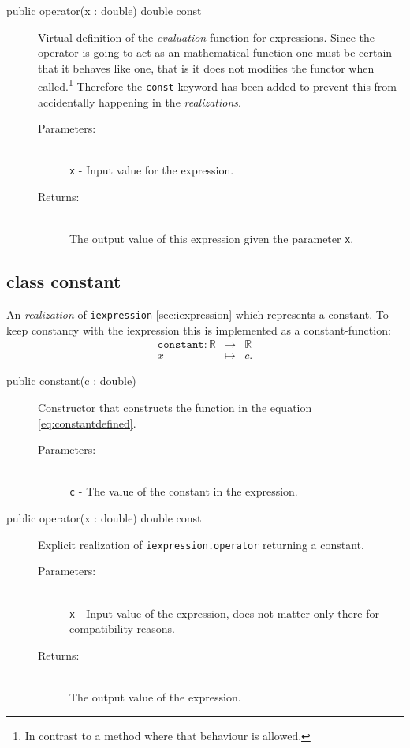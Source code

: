 \documentclass[a4paper,11pt]{kth-mag}
\newcommand{\RR}{\ensuremath{\mathbb{R}}}
\begin{document}
\begin{description}
    \item[public operator(x : double) double const] 
    Virtual definition of the \emph{evaluation} function for expressions. 
    Since the operator is going to act as an mathematical function one must be certain
    that it behaves like one, that is it does not modifies the functor when
    called.\footnote{In contrast to a method where that behaviour is allowed.}
    Therefore the \texttt{const} keyword has been added to prevent this
    from accidentally happening in the \emph{realizations}.
    \begin{description}
        \item[Parameters:]~\\
            \verb+x+ - Input value for the expression. 
        \item[Returns:]~\\
            The output value of this expression given the parameter \texttt{x}.
    \end{description}
\end{description}

\subsection{class constant} An \emph{realization} of \texttt{iexpression}
\ref{sec:iexpression} which represents a constant. To keep constancy with the
iexpression this is implemented as a constant-function:
\begin{eqnarray}
    \label{eq:constantdefined}
    \texttt{constant}: \RR &\rightarrow& \RR \nonumber \\
    x &\mapsto& c .
\end{eqnarray}
\begin{description}
    \item[public constant(c : double)] Constructor 
    that constructs the function in the equation \ref{eq:constantdefined}. 
    \begin{description}
        \item[Parameters:]~\\
            \verb+c+ - The value of the constant in the expression.
    \end{description}
\end{description}
\begin{description}
    \item[public operator(x : double) double const] 
    Explicit realization of \texttt{iexpression.operator} returning a
    constant.
    \begin{description}
        \item[Parameters:]~\\
            \verb+x+ - Input value of the expression, does not matter only
            there for compatibility reasons. 
        \item[Returns:]~\\
            The output value of the expression.
    \end{description}
\end{description}
\end{document}
